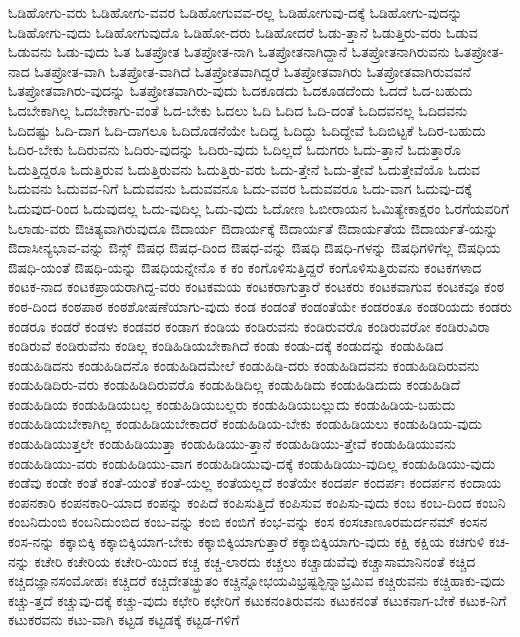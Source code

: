 {ಓಡಿಹೋಗು-ವರು
ಓಡಿಹೋಗು-ವವರ
ಓಡಿಹೋಗುವವ-ರಲ್ಲ
ಓಡಿಹೋಗುವು-ದಕ್ಕೆ
ಓಡಿಹೋಗು-ವುದನ್ನು
ಓಡಿಹೋಗು-ವುದು
ಓಡಿಹೋಗುವುದೊ
ಓಡಿಹೋ-ದರು
ಓಡಿಹೋದರೆ
ಓಡು-ತ್ತಾನೆ
ಓಡುತ್ತಿರು-ವರು
ಓಡುವ
ಓಡುವನು
ಓಡು-ವುದು
ಓತ
ಓತಪ್ರೋತ
ಓತಪ್ರೋತ-ನಾಗಿ
ಓತಪ್ರೋತನಾಗಿದ್ದಾನೆ
ಓತಪ್ರೋತನಾಗಿರುವನು
ಓತಪ್ರೋತ-ನಾದ
ಓತಪ್ರೋತ-ವಾಗಿ
ಓತಪ್ರೋತ-ವಾಗಿದೆ
ಓತಪ್ರೋತವಾಗಿದ್ದರೆ
ಓತಪ್ರೋತವಾಗಿರು
ಓತಪ್ರೋತವಾಗಿರುವವನೆ
ಓತಪ್ರೋತವಾಗಿರು-ವುದನ್ನು
ಓತಪ್ರೋತವಾಗಿರು-ವುದು
ಓದಕೂಡದು
ಓದಕೂಡದೆಂದು
ಓದದೆ
ಓದ-ಬಹುದು
ಓದಬೇಕಾಗಿಲ್ಲ
ಓದಬೇಕಾಗು-ವಂತೆ
ಓದ-ಬೇಕು
ಓದಲು
ಓದಿ
ಓದಿದ
ಓದಿ-ದಂತೆ
ಓದಿದವನಲ್ಲ
ಓದಿದವನು
ಓದಿದಷ್ಟು
ಓದಿ-ದಾಗ
ಓದಿ-ದಾಗಲೂ
ಓದಿದೊಡನೆಯೇ
ಓದಿದ್ದ
ಓದಿದ್ದು
ಓದಿದ್ದೇವೆ
ಓದಿಬಿಟ್ಟಕೆ
ಓದಿರ-ಬಹುದು
ಓದಿರ-ಬೇಕು
ಓದಿರುವನು
ಓದಿರು-ವುದನ್ನು
ಓದಿರು-ವುದು
ಓದಿಲ್ಲದೆ
ಓದುಗರು
ಓದು-ತ್ತಾನೆ
ಓದುತ್ತಾರೊ
ಓದುತ್ತಿದ್ದರೂ
ಓದುತ್ತಿರುವ
ಓದುತ್ತಿರುವನು
ಓದುತ್ತಿರು-ವರು
ಓದು-ತ್ತೇನೆ
ಓದು-ತ್ತೇವೆ
ಓದುತ್ತೇವೆಯೊ
ಓದುವ
ಓದುವನು
ಓದುವವ-ನಿಗೆ
ಓದುವವನು
ಓದುವವನೂ
ಓದು-ವವರ
ಓದುವವರೂ
ಓದು-ವಾಗ
ಓದುವು-ದಕ್ಕೆ
ಓದುವುದ-ರಿಂದ
ಓದುವುದಲ್ಲ
ಓದು-ವುದಿಲ್ಲ
ಓದು-ವುದು
ಓದೋಣ
ಓಬೀರಾಯನ
ಓಮಿತ್ಯೇಕಾಕ್ಷರಂ
ಓರಗೆಯವರಿಗೆ
ಓಲಾಡು-ವರು
ಔಚಿತ್ಯವಾಗಿರುವುದೂ
ಔದಾರ್ಯ
ಔದಾರ್ಯಕ್ಕೆ
ಔದಾರ್ಯತೆ
ಔದಾರ್ಯತೆಯ
ಔದಾರ್ಯತೆ-ಯನ್ನು
ಔದಾಸೀನ್ಯಭಾವ-ವನ್ನು
ಔನ್ಸ್
ಔಷಧ
ಔಷಧ-ದಿಂದ
ಔಷಧ-ವನ್ನು
ಔಷಧಿ
ಔಷಧಿ-ಗಳನ್ನು
ಔಷಧಿಗಳಿಗೆಲ್ಲ
ಔಷಧಿಯ
ಔಷಧಿ-ಯಂತೆ
ಔಷಧಿ-ಯನ್ನು
ಔಷಧಿಯನ್ನೇನೊ
ಕ
ಕಂ
ಕಂಗೊಳಿಸುತ್ತಿದ್ದರೆ
ಕಂಗೊಳಿಸುತ್ತಿರುವನು
ಕಂಟಕಗಳಾದ
ಕಂಟಕ-ನಾದ
ಕಂಟಕಪ್ರಾಯರಾಗಿದ್ದ-ವರು
ಕಂಟಕಮಯ
ಕಂಟಕರಾಗುತ್ತಾರೆ
ಕಂಟಕರು
ಕಂಟಕವಾಗುವ
ಕಂಟಕವೂ
ಕಂಠ
ಕಂಠ-ದಿಂದ
ಕಂಠಪಾಠ
ಕಂಠಶೋಷಣೆಯಾಗು-ವುದು
ಕಂಡ
ಕಂಡಂತೆ
ಕಂಡಂತೆಯೇ
ಕಂಡರಂತೂ
ಕಂಡರಿಯದು
ಕಂಡರು
ಕಂಡರೂ
ಕಂಡರೆ
ಕಂಡಳು
ಕಂಡವರ
ಕಂಡಾಗ
ಕಂಡಿಯ
ಕಂಡಿರುವನು
ಕಂಡಿರುವರೊ
ಕಂಡಿರುವರೋ
ಕಂಡಿರುವಿರಾ
ಕಂಡಿರುವೆ
ಕಂಡಿರುವೆನು
ಕಂಡಿಲ್ಲ
ಕಂಡಿಹಿಡಿಯಬೇಕಾಗಿದೆ
ಕಂಡು
ಕಂಡು-ದಕ್ಕೆ
ಕಂಡುದನ್ನು
ಕಂಡುಹಿಡಿದ
ಕಂಡುಹಿಡಿದನು
ಕಂಡುಹಿಡಿದನೊ
ಕಂಡುಹಿಡಿದಮೇಲೆ
ಕಂಡುಹಿಡಿ-ದರು
ಕಂಡುಹಿಡಿದವನು
ಕಂಡುಹಿಡಿದಿರುವನು
ಕಂಡುಹಿಡಿದಿರು-ವರು
ಕಂಡುಹಿಡಿದಿರುವರೊ
ಕಂಡುಹಿಡಿದಿಲ್ಲ
ಕಂಡುಹಿಡಿದು
ಕಂಡುಹಿಡಿದುದು
ಕಂಡುಹಿಡಿದೆ
ಕಂಡುಹಿಡಿಯ
ಕಂಡುಹಿಡಿಯಬಲ್ಲ
ಕಂಡುಹಿಡಿಯಬಲ್ಲರು
ಕಂಡುಹಿಡಿಯಬಲ್ಲುದು
ಕಂಡುಹಿಡಿಯ-ಬಹುದು
ಕಂಡುಹಿಡಿಯಬೇಕಾಗಿಲ್ಲ
ಕಂಡುಹಿಡಿಯಬೇಕಾದರೆ
ಕಂಡುಹಿಡಿಯ-ಬೇಕು
ಕಂಡುಹಿಡಿಯಲು
ಕಂಡುಹಿಡಿಯ-ವುದು
ಕಂಡುಹಿಡಿಯುತ್ತಲೇ
ಕಂಡುಹಿಡಿಯುತ್ತಾ
ಕಂಡುಹಿಡಿಯು-ತ್ತಾನೆ
ಕಂಡುಹಿಡಿಯು-ತ್ತೇವೆ
ಕಂಡುಹಿಡಿಯುವನು
ಕಂಡುಹಿಡಿಯು-ವರು
ಕಂಡುಹಿಡಿಯು-ವಾಗ
ಕಂಡುಹಿಡಿಯುವು-ದಕ್ಕೆ
ಕಂಡುಹಿಡಿಯು-ವುದಿಲ್ಲ
ಕಂಡುಹಿಡಿಯು-ವುದು
ಕಂಡೆವು
ಕಂಡೇ
ಕಂತೆ
ಕಂತೆ-ಯಂತೆ
ಕಂತೆ-ಯಲ್ಲ
ಕಂತೆಯಲ್ಲದೆ
ಕಂತೆಯೇ
ಕಂದರ್ಪ
ಕಂದರ್ಪಃ
ಕಂದರ್ಪನ
ಕಂದಾಯ
ಕಂಪನಕಾರಿ
ಕಂಪನಕಾರಿ-ಯಾದ
ಕಂಪನ್ನು
ಕಂಪಿದೆ
ಕಂಪಿಸುತ್ತಿದೆ
ಕಂಪಿಸುವ
ಕಂಪಿಸು-ವುದು
ಕಂಬ
ಕಂಬ-ದಿಂದ
ಕಂಬನಿ
ಕಂಬನಿದುಂಬಿ
ಕಂಬನಿದುಂಬಿದ
ಕಂಬ-ವನ್ನು
ಕಂಬಿ
ಕಂಬಿಗೆ
ಕಂಭ-ವನ್ನು
ಕಂಸ
ಕಂಸಚಾಣೂರಮರ್ದನಮ್
ಕಂಸನ
ಕಂಸ-ನನ್ನು
ಕಕ್ಕಾಬಿಕ್ಕಿ
ಕಕ್ಕಾಬಿಕ್ಕಿಯಾಗ-ಬೇಕು
ಕಕ್ಕಾಬಿಕ್ಕಿಯಾಗುತ್ತಾರೆ
ಕಕ್ಕಾಬಿಕ್ಕಿಯಾಗು-ವುದು
ಕಕ್ಷಿ
ಕಕ್ಷಿಯ
ಕಚಗುಳಿ
ಕಚ-ನನ್ನು
ಕಚೇರಿ
ಕಚೇರಿಯ
ಕಚೇರಿ-ಯಿಂದ
ಕಚ್ಚ
ಕಚ್ಚ-ಲಾರದು
ಕಚ್ಚಲು
ಕಚ್ಚಾಡುವೆವು
ಕಚ್ಚಾಸಾಮಾನಿನಂತೆ
ಕಚ್ಚಿದ
ಕಚ್ಚಿದಜ್ಞಾನಸಂಮೋಹಃ
ಕಚ್ಚಿದರೆ
ಕಚ್ಚಿದೇತಚ್ಛ್ರುತಂ
ಕಚ್ಚಿನ್ನೋಭಯವಿಭ್ರಷ್ಟಶ್ಛಿನ್ನಾಭ್ರಮಿವ
ಕಚ್ಚಿರುವನು
ಕಚ್ಚಿಹಾಕು-ವುದು
ಕಚ್ಚು-ತ್ತದೆ
ಕಚ್ಚುವು-ದಕ್ಕೆ
ಕಚ್ಚು-ವುದು
ಕಛೇರಿ
ಕಛೇರಿಗೆ
ಕಟುಕನಂತಿರುವನು
ಕಟುಕನಂತೆ
ಕಟುಕನಾಗ-ಬೇಕೆ
ಕಟುಕ-ನಿಗೆ
ಕಟುಕರವನು
ಕಟು-ವಾಗಿ
ಕಟ್ಟಡ
ಕಟ್ಟಡಕ್ಕೆ
ಕಟ್ಟಡ-ಗಳಿಗೆ
}
